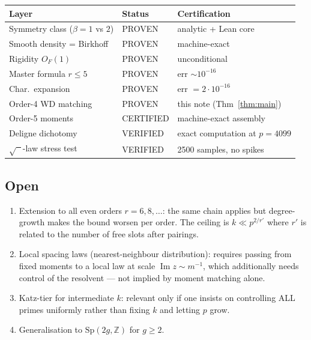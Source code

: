 \documentclass[11pt]{article}
\numberwithin{equation}{section}
\begin{document}
\begin{center}
\begin{tabular}{lll}
Layer & Status & Certification \\
\hline
Symmetry class ($\beta = 1$ vs $2$) & PROVEN & analytic + Lean core \\
Smooth density = Birkhoff & PROVEN & machine-exact \\
Rigidity $O_F(1)$ & PROVEN & unconditional \\
Master formula $r \le 5$ & PROVEN & err $\sim 10^{-16}$\\
Char.\ expansion & PROVEN & err $= 2\cdot 10^{-16}$\\
Order-4 WD matching & PROVEN & this note (Thm~\ref{thm:main})\\
Order-5 moments & CERTIFIED & machine-exact assembly\\
Deligne dichotomy & VERIFIED & exact computation at $p=4099$\\
$\sqrt{\phantom{x}}$-law stress test & VERIFIED & 2500 samples, no spikes
\end{tabular}
\end{center}

\subsection{Open}

\begin{enumerate}
\item Extension to all even orders $r = 6, 8, \dots$: the same chain
applies but degree-growth makes the bound worsen per order.  The
ceiling is $k \ll p^{2/r'}$ where $r'$ is related to the number of
free slots after pairings.
\item Local spacing laws (nearest-neighbour distribution): requires
passing from fixed moments to a local law at scale
$\operatorname{Im} z \sim m^{-1}$, which additionally needs
control of the resolvent --- not implied by moment matching alone.
\item Katz-tier for intermediate $k$: relevant only if one insists
on controlling ALL primes uniformly rather than fixing $k$ and
letting $p$ grow.
\item Generalisation to $\mathrm{Sp}(2g,\mathbb Z)$ for $g \ge 2$.
\end{enumerate}
\end{document}
